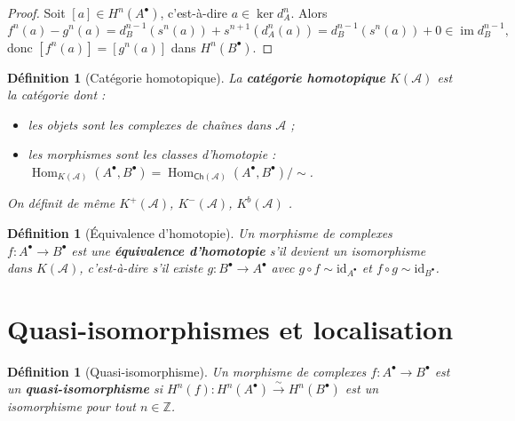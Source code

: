 \documentclass[a4paper,12pt]{book}
\DeclareMathOperator{\Hom}{Hom}
\DeclareMathOperator{\im}{im}
\newcommand{\id}{\mathrm{id}}
\newcommand{\Z}{\mathbb{Z}}
\newtheorem{definition}[theoreme]{Définition}
\begin{document}
\begin{proof}
Soit $[a] \in H^n(A^\bullet)$, c'est-à-dire $a \in \ker d_A^n$.
Alors
\[
  f^n(a) - g^n(a) = d_B^{n-1}(s^n(a)) + s^{n+1}(d_A^n(a))
  = d_B^{n-1}(s^n(a)) + 0 \in \im d_B^{n-1},
\]
donc $[f^n(a)] = [g^n(a)]$ dans $H^n(B^\bullet)$.
\end{proof}

\begin{definition}[Catégorie homotopique]\label{def:homotopy-category}
La \textbf{catégorie homotopique} $K(\mathcal{A})$ est la catégorie dont :
\begin{itemize}
\item les objets sont les complexes de chaînes dans $\mathcal{A}$ ;
\item les morphismes sont les classes d'homotopie :
  $\Hom_{K(\mathcal{A})}(A^\bullet, B^\bullet)
  = \Hom_{\mathsf{Ch}(\mathcal{A})}(A^\bullet, B^\bullet) / {\sim}$.
\end{itemize}
On définit de même $K^+(\mathcal{A})$, $K^-(\mathcal{A})$,
$K^b(\mathcal{A})$%
.
\end{definition}

\begin{definition}[Équivalence d'homotopie]\label{def:homotopy-equivalence}
Un morphisme de complexes $f \colon A^\bullet \to B^\bullet$ est une
\textbf{équivalence d'homotopie} s'il devient un isomorphisme dans
$K(\mathcal{A})$, c'est-à-dire s'il existe $g \colon B^\bullet \to A^\bullet$
avec $g \circ f \sim \id_{A^\bullet}$ et $f \circ g \sim \id_{B^\bullet}$.
\end{definition}


\section{Quasi-isomorphismes et localisation}\label{sec:quasi-iso}

\begin{definition}[Quasi-isomorphisme]\label{def:quasi-iso}
Un morphisme de complexes $f \colon A^\bullet \to B^\bullet$ est un
\textbf{quasi-isomorphisme} si
$H^n(f) \colon H^n(A^\bullet) \xrightarrow{\;\sim\;} H^n(B^\bullet)$
est un isomorphisme pour tout $n \in \Z$.
\end{definition}
\end{document}
